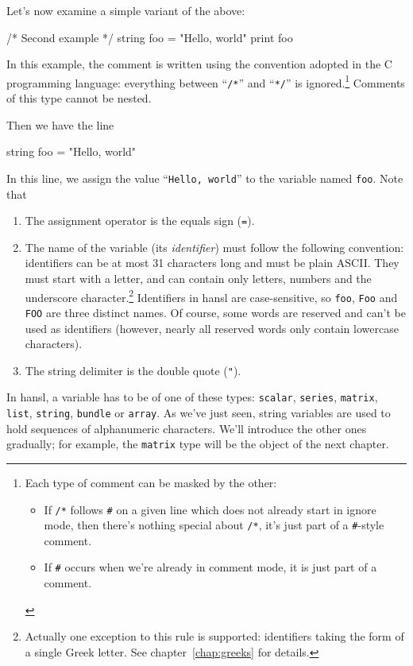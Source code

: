 Let's now examine a simple variant of the above:
\begin{code}
  /*
    Second example
  */
  string foo = "Hello, world"
  print foo
\end{code}

In this example, the comment is written using the convention adopted
in the C programming language: everything between ``\verb|/*|'' and
``\verb|*/|'' is ignored.\footnote{Each type of comment can be masked
  by the other:
\begin{itemize}
\item If \texttt{/*} follows \texttt{\#} on a given line which does
  not already start in ignore mode, then there's nothing special about
  \texttt{/*}, it's just part of a \texttt{\#}-style comment.
\item If \texttt{\#} occurs when we're already in comment mode, it is
  just part of a comment.
\end{itemize}} Comments of this type cannot be nested.

Then we have the line
\begin{code}
  string foo = "Hello, world"
\end{code}
In this line, we assign the value ``\texttt{Hello, world}'' to the
variable named \texttt{foo}. Note that
\begin{enumerate}
\item The assignment operator is the equals sign (\texttt{=}).
\item The name of the variable (its \emph{identifier}) must follow the
  following convention: identifiers can be at most 31 characters long
  and must be plain ASCII. They must start with a letter, and can
  contain only letters, numbers and the underscore
  character.\footnote{Actually one exception to this rule is
    supported: identifiers taking the form of a single Greek
    letter. See chapter~\ref{chap:greeks} for details.} Identifiers in
  hansl are case-sensitive, so \texttt{foo}, \texttt{Foo} and
  \texttt{FOO} are three distinct names. Of course, some words are
  reserved and can't be used as identifiers (however, nearly all
  reserved words only contain lowercase characters).
\item The string delimiter is the double quote (\verb|"|). 
\end{enumerate}

In hansl, a variable has to be of one of these types: \texttt{scalar},
\texttt{series}, \texttt{matrix}, \texttt{list}, \texttt{string},
\texttt{bundle} or \texttt{array}. As we've just seen, string
variables are used to hold sequences of alphanumeric characters. We'll
introduce the other ones gradually; for example, the \texttt{matrix}
type will be the object of the next chapter.

